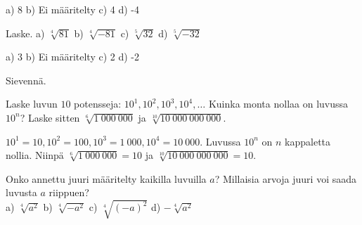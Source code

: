 \begin{tehtavasivu}
\begin{tehtava}
\begin{vastaus}
a) 8 b) Ei määritelty c) 4 d) -4
\end{vastaus}
\end{tehtava}

\begin{tehtava}
Laske.
a) $\sqrt[4]{81}$ \quad b) $\sqrt[4]{-81}$ \quad c) $\sqrt[5]{32}$ \quad d) $\sqrt[5]{-32}$

\begin{vastaus}
a) 3 b) Ei määritelty c) 2 d) -2
\end{vastaus}
\end{tehtava}

\begin{tehtava}
 Sievennä.
	\begin{alakohdat}
	\end{alakohdat}
	  \begin{vastaus}
		\begin{alakohdat}
		 \alakohta{$\sqrt{3}$}
		 \alakohta{$\sqrt[3]{2}$}
		 \alakohta{${\sqrt[60]{42}}^{11}$}
		\end{alakohdat}
	\end{vastaus}
\end{tehtava}


\begin{tehtava}
Laske luvun $10$ potensseja: $10^1, 10^2, 10^3, 10^4, \ldots$ Kuinka monta nollaa on luvussa $10^n$? Laske sitten $\sqrt[6]{1~000~000}$ ja $\sqrt[10]{10~000~000~000}$.

\begin{vastaus}
$10^1 = 10, 10^2 = 100, 10^3 = 1~000, 10^4 = 10~000$. Luvussa $10^n$ on $n$ kappaletta nollia. Niinpä $\sqrt[6]{1~000~000} = 10$ ja $\sqrt[10]{10~000~000~000} = 10$.
\end{vastaus}
\end{tehtava}

\begin{tehtava}
Onko annettu juuri määritelty kaikilla luvuilla $a$? Millaisia arvoja juuri voi saada luvusta $a$ riippuen?\\
a) $\sqrt[4]{a^2}$ \quad b) $\sqrt[4]{-a^2}$ \quad c) $\sqrt[4]{(-a)^2}$ \quad d) $- \sqrt[4]{a^2}$

\begin{vastaus}


\end{vastaus}
\end{tehtava}
\end{tehtavasivu}
